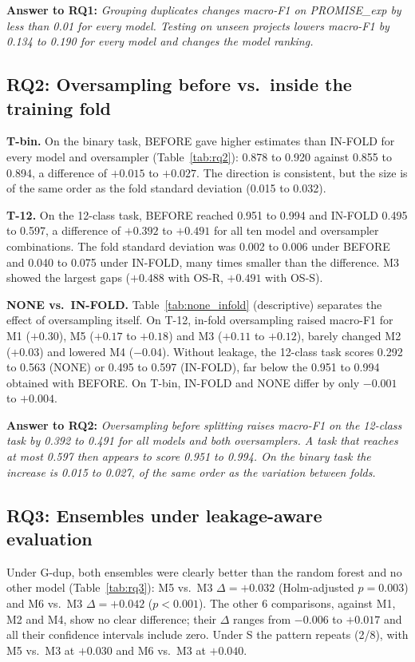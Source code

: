 \textbf{Answer to RQ1:} \emph{Grouping duplicates changes macro-F1 on PROMISE\_exp by less than 0.01 for every model. Testing on unseen projects lowers macro-F1 by 0.134 to 0.190 for every model and changes the model ranking.}

\subsection{RQ2: Oversampling before vs.\ inside the training fold}


\textbf{T-bin.} On the binary task, BEFORE gave higher estimates than IN-FOLD for every model and oversampler (Table~\ref{tab:rq2}): 0.878 to 0.920 against 0.855 to 0.894, a difference of $+0.015$ to $+0.027$. The direction is consistent, but the size is of the same order as the fold standard deviation (0.015 to 0.032).

\textbf{T-12.} On the 12-class task, BEFORE reached 0.951 to 0.994 and IN-FOLD 0.495 to 0.597, a difference of $+0.392$ to $+0.491$ for all ten model and oversampler combinations. The fold standard deviation was 0.002 to 0.006 under BEFORE and 0.040 to 0.075 under IN-FOLD, many times smaller than the difference. M3 showed the largest gaps ($+0.488$ with OS-R, $+0.491$ with OS-S).

\textbf{NONE vs.\ IN-FOLD.} Table~\ref{tab:none_infold} (descriptive) separates the effect of oversampling itself. On T-12, in-fold oversampling raised macro-F1 for M1 ($+0.30$), M5 ($+0.17$ to $+0.18$) and M3 ($+0.11$ to $+0.12$), barely changed M2 ($+0.03$) and lowered M4 ($-0.04$). Without leakage, the 12-class task scores 0.292 to 0.563 (NONE) or 0.495 to 0.597 (IN-FOLD), far below the 0.951 to 0.994 obtained with BEFORE. On T-bin, IN-FOLD and NONE differ by only $-0.001$ to $+0.004$.

\textbf{Answer to RQ2:} \emph{Oversampling before splitting raises macro-F1 on the 12-class task by 0.392 to 0.491 for all models and both oversamplers. A task that reaches at most 0.597 then appears to score 0.951 to 0.994. On the binary task the increase is 0.015 to 0.027, of the same order as the variation between folds.}

\subsection{RQ3: Ensembles under leakage-aware evaluation}


Under G-dup, both ensembles were clearly better than the random forest and no other model (Table~\ref{tab:rq3}): M5 vs.\ M3 $\Delta = +0.032$ (Holm-adjusted $p = 0.003$) and M6 vs.\ M3 $\Delta = +0.042$ ($p < 0.001$). The other 6 comparisons, against M1, M2 and M4, show no clear difference; their $\Delta$ ranges from $-0.006$ to $+0.017$ and all their confidence intervals include zero. Under S the pattern repeats (2/8), with M5 vs.\ M3 at $+0.030$ and M6 vs.\ M3 at $+0.040$.

